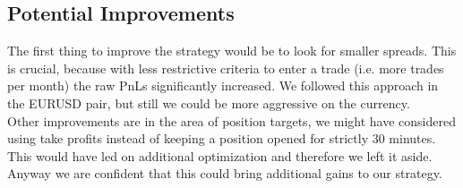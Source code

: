 \documentclass[a4paper]{article}
\begin{document}
\subsection{Potential Improvements}

The first thing to improve the strategy would be to look for smaller spreads. This is crucial, because with less restrictive criteria to enter a trade (i.e. more trades per month) the raw PnLs significantly increased. We followed this approach in the EURUSD pair, but still we could be more aggressive on the currency.\\
Other improvements are in the area of position targets, we might have considered using take profits instead of keeping a position opened for strictly 30 minutes. This would have led on additional optimization and therefore we left it aside. Anyway we are confident that this could bring additional gains to our strategy.\\

 
\end{document}
